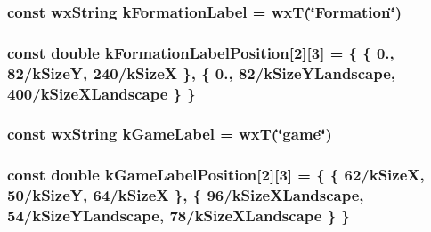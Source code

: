 \hypertarget{a00222_ae5a0e1ae8b6fe484334e0c161c4e2331}{
\subsubsection[{k\-Formation\-Label}]{\setlength{\rightskip}{0pt plus 5cm}const wx\-String k\-Formation\-Label = wx\-T(\char`\"{}Formation\char`\"{})\hspace{0.3cm}{\ttfamily [static]}}}\label{a00222_ae5a0e1ae8b6fe484334e0c161c4e2331}
\hypertarget{a00222_a8177bc66dc20326e373180e39c56355e}{
\subsubsection[{k\-Formation\-Label\-Position}]{\setlength{\rightskip}{0pt plus 5cm}const double k\-Formation\-Label\-Position\mbox{[}2\mbox{]}\mbox{[}3\mbox{]} = \{ \{ 0., 82/{\bf k\-Size\-Y}, 240/{\bf k\-Size\-X} \}, \{ 0., 82/{\bf k\-Size\-Y\-Landscape}, 400/{\bf k\-Size\-X\-Landscape} \} \}\hspace{0.3cm}{\ttfamily [static]}}}\label{a00222_a8177bc66dc20326e373180e39c56355e}
\hypertarget{a00222_a32e98b2590b7813d7ae3f82201bc17ff}{
\subsubsection[{k\-Game\-Label}]{\setlength{\rightskip}{0pt plus 5cm}const wx\-String k\-Game\-Label = wx\-T(\char`\"{}game\char`\"{})\hspace{0.3cm}{\ttfamily [static]}}}\label{a00222_a32e98b2590b7813d7ae3f82201bc17ff}
\hypertarget{a00222_a646d182bcfafe7ee196db119ce9fc544}{
\subsubsection[{k\-Game\-Label\-Position}]{\setlength{\rightskip}{0pt plus 5cm}const double k\-Game\-Label\-Position\mbox{[}2\mbox{]}\mbox{[}3\mbox{]} = \{ \{ 62/{\bf k\-Size\-X}, 50/{\bf k\-Size\-Y}, 64/{\bf k\-Size\-X} \}, \{ 96/{\bf k\-Size\-X\-Landscape}, 54/{\bf k\-Size\-Y\-Landscape}, 78/{\bf k\-Size\-X\-Landscape} \} \}\hspace{0.3cm}{\ttfamily [static]}}}\label{a00222_a646d182bcfafe7ee196db119ce9fc544}
